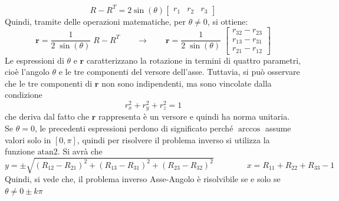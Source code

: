 ﻿\documentclass[11pt, a4paper]{article}
\begin{document}
\[
    R - R^{T} = 2 \sin(\theta)
    \begin{bmatrix}
        r_1 & r_2 & r_3
    \end{bmatrix}
\]
Quindi, tramite delle operazioni matematiche, per $\theta \ne 0$, si ottiene:
\[
    \mathbf{r} = \frac{1}{2 \; \sin(\theta)} \; R - R^{T}
    \qquad\longrightarrow\qquad
    \mathbf{r} = \frac{1}{2 \; \sin(\theta)} \;
    \begin{bmatrix}
        r_{32} - r_{23}\\
        r_{13} - r_{31}\\
        r_{21} - r_{12}
    \end{bmatrix}
\]
Le espressioni di $\theta$ e $\mathbf{r}$ caratterizzano la rotazione in termini di quattro parametri, cioè l'angolo $\theta$ e le tre componenti del versore dell'asse. Tuttavia, si può osservare che le tre componenti di $\mathbf{r}$ non sono indipendenti, ma sono vincolate dalla condizione
\[
    r_{x}^{2} + r_{y}^{2} + r_{z}^{2} = 1
\]
che deriva dal fatto che $\mathbf{r}$ rappresenta è un versore e quindi ha norma unitaria.\\
Se $\theta = 0$, le precedenti espressioni perdono di significato perché $\arccos$ assume valori solo in $[0, \pi]$, quindi per risolvere il problema inverso si utilizza la funzione $\text{atan2}$. Si avrà che
\[
    y = \pm \sqrt{(R_{12} - R_{21})^{2} + (R_{13} - R_{31})^{2} + (R_{23} - R_{32})^{2}} \qquad\qquad x = R_{11} + R_{22} + R_{33} - 1
\]
Quindi, si vede che, il problema inverso Asse-Angolo è risolvibile se e solo se $\theta \ne 0 \pm k\pi$
\newpage
\end{document}
